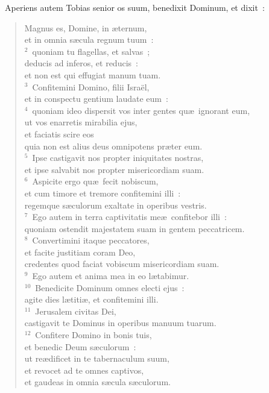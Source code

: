 ~Aperiens autem Tobias senior os suum, benedixit Dominum, et dixit~: \begin{flushleft}\begin{verse}\vspace{6pt}Magnus es, Domine, in \ae ternum,\\ et in omnia s\ae cula regnum tuum~:\\
${}^{2}$~quoniam tu flagellas, et salvas~;\\ deducis ad inferos, et reducis~:\\ et non est qui effugiat manum tuam.\\
${}^{3}$~Confitemini Domino, filii Isra\"el,\\ et in conspectu gentium laudate eum~:\\
${}^{4}$~quoniam ideo dispersit vos inter gentes qu\ae\ ignorant eum,\\ ut vos enarretis mirabilia ejus,\\ et faciatis scire eos\\ quia non est alius deus omnipotens pr\ae ter eum.\\
${}^{5}$~Ipse castigavit nos propter iniquitates nostras,\\ et ipse salvabit nos propter misericordiam suam.\\
${}^{6}$~Aspicite ergo qu\ae\ fecit nobiscum,\\ et cum timore et tremore confitemini illi~:\\ regemque s\ae culorum exaltate in operibus vestris.\\
${}^{7}$~Ego autem in terra captivitatis me\ae\ confitebor illi~:\\ quoniam ostendit majestatem suam in gentem peccatricem.\\
${}^{8}$~Convertimini itaque peccatores,\\ et facite justitiam coram Deo,\\ credentes quod faciat vobiscum misericordiam suam.\\
${}^{9}$~Ego autem et anima mea in eo l\ae tabimur.\\
${}^{10}$~Benedicite Dominum omnes electi ejus~:\\ agite dies l\ae titi\ae , et confitemini illi.\\
${}^{11}$~Jerusalem civitas Dei,\\ castigavit te Dominus in operibus manuum tuarum.\\
${}^{12}$~Confitere Domino in bonis tuis,\\ et benedic Deum s\ae culorum~:\\ ut re\ae dificet in te tabernaculum suum,\\ et revocet ad te omnes captivos,\\ et gaudeas in omnia s\ae cula s\ae culorum.\\

\end{verse}
\end{flushleft}
